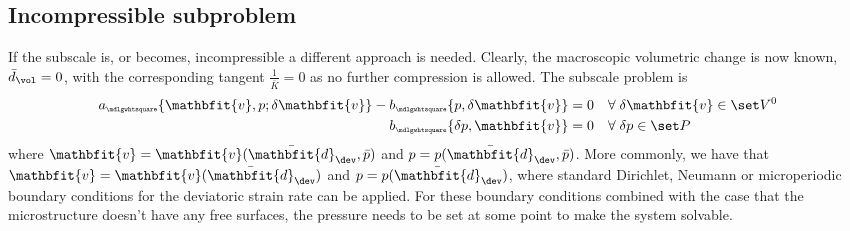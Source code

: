 \documentclass[a4paper,11pt]{article}
\renewcommand{\ta}[1]{\mathbfit{#1}}
\renewcommand{\ts}[1]{\mathbfit{#1}}
\renewcommand{\Box}{{\scalebox{0.5}{\mdlgwhtsquare}}}
\begin{document}
\subsection{Incompressible subproblem} \label{sec:nested_incompressible}
If the subscale is, or becomes, incompressible a different approach is needed.
Clearly, the macroscopic volumetric change is now known, $\bar{d}_\vol = 0$, with the corresponding tangent $\frac{1}{\bar{K}} = 0$ as no further compression is allowed.
The subscale problem is
\begin{align}
 a_\Box\{\ta v, p; \delta\ta v\} - b_\Box\{p,\delta\ta v\} &= 0\quad \forall\;\delta\ta v \in \set V^0 \\
 b_\Box\{\delta p, \ta v\} &= 0\quad \forall\;\delta p \in \set P
\end{align}
where $\ta v = \ta v(\bar{\ts d}_\dev, \bar p)$ and $p = p(\bar{\ts d}_\dev, \bar p)$. More commonly, we have that 
$\ta v = \ta v(\bar{\ts d}_\dev)$ and $p = p(\bar{\ts d}_\dev)$, 
where standard Dirichlet, Neumann  or microperiodic boundary conditions for the deviatoric strain rate can be applied.
For these boundary conditions combined with the case that the microstructure doesn't have any free surfaces, 
the pressure needs to be set at some point to make the system solvable.
\end{document}
